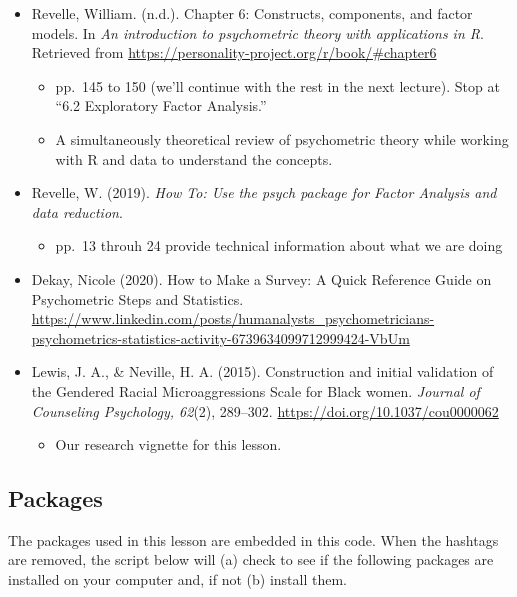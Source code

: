 \documentclass[
  english,
]{book}
\providecommand{\tightlist}{%
  \setlength{\itemsep}{0pt}\setlength{\parskip}{0pt}}
\begin{document}
\begin{itemize}
\tightlist
\item
  Revelle, William. (n.d.). Chapter 6: Constructs, components, and factor models. In \emph{An introduction to psychometric theory with applications in R}. Retrieved from \url{https://personality-project.org/r/book/\#chapter6}

  \begin{itemize}
  \tightlist
  \item
    pp.~145 to 150 (we'll continue with the rest in the next lecture). Stop at ``6.2 Exploratory Factor Analysis.''
  \item
    A simultaneously theoretical review of psychometric theory while working with R and data to understand the concepts.
  \end{itemize}
\item
  Revelle, W. (2019). \emph{How To: Use the psych package for Factor Analysis and data reduction}.

  \begin{itemize}
  \tightlist
  \item
    pp.~13 throuh 24 provide technical information about what we are doing
  \end{itemize}
\item
  Dekay, Nicole (2020). How to Make a Survey: A Quick Reference Guide on Psychometric Steps and Statistics. \url{https://www.linkedin.com/posts/humanalysts_psychometricians-psychometrics-statistics-activity-6739634099712999424-VbUm}
\item
  Lewis, J. A., \& Neville, H. A. (2015). Construction and initial validation of the Gendered Racial Microaggressions Scale for Black women. \emph{Journal of Counseling Psychology, 62}(2), 289--302. \url{https://doi.org/10.1037/cou0000062}

  \begin{itemize}
  \tightlist
  \item
    Our research vignette for this lesson.
  \end{itemize}
\end{itemize}

\hypertarget{packages-6}{%
\subsection{Packages}\label{packages-6}}

The packages used in this lesson are embedded in this code. When the hashtags are removed, the script below will (a) check to see if the following packages are installed on your computer and, if not (b) install them.
\end{document}
